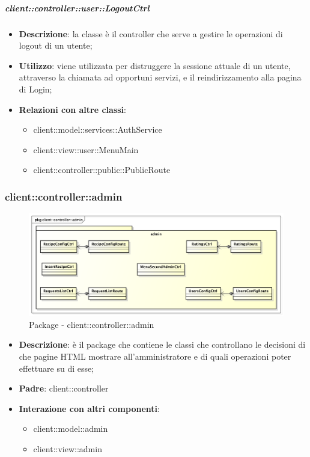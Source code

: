 		\subparagraph{client::controller::user::LogoutCtrl} %
		\label{subp:bdsm_app_client_controller_user_logoutctrl}
			\begin{itemize}
				\item \textbf{Descrizione}: la classe è il controller che serve a gestire le operazioni di logout di un utente;
				\item \textbf{Utilizzo}: viene utilizzata per distruggere la sessione attuale di un utente, attraverso la chiamata ad opportuni servizi, e il reindirizzamento alla pagina di Login;
				\item \textbf{Relazioni con altre classi}:
					\begin{itemize}
						\item client::model::services::AuthService
						\item client::view::user::MenuMain
						\item client::controller::public::PublicRoute
					\end{itemize}
			\end{itemize}



\subsubsection{client::controller::admin} %
\label{ssub:bdsm_app_client_controller_admin}
\begin{figure}[htbp]
	\centering
	\centerline{\includegraphics[scale=0.45]{./images/client/client_controller_admin.pdf}}
	\caption{Package - client::controller::admin}
\end{figure}

\begin{itemize}
	\item \textbf{Descrizione}: è il package che contiene le classi che controllano le decisioni di che pagine HTML mostrare all'amministratore e di quali operazioni poter effettuare su di esse;
	\item \textbf{Padre}: client::controller
	\item \textbf{Interazione con altri componenti}:
		\begin{itemize}
			\item client::model::admin
			\item client::view::admin
		\end{itemize}
\end{itemize}

